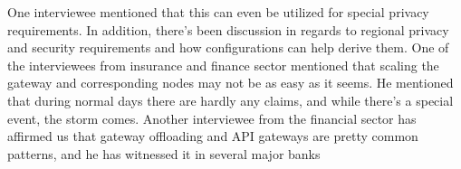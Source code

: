 \documentclass[a4paper,11pt,article,oneside]{memoir}
\begin{document}

One interviewee mentioned that this can even be utilized for special privacy requirements. In addition, there's been discussion in regards to regional privacy and security requirements and how configurations can help derive them. One of the interviewees from insurance and finance sector mentioned that scaling the gateway and corresponding nodes may not be as easy as it seems. He mentioned that during normal days there are hardly any claims, and while there's a special event, the storm comes.  Another interviewee from the financial sector has affirmed us that gateway offloading and API gateways are pretty common patterns, and he has witnessed it in several major banks








\end{document}
